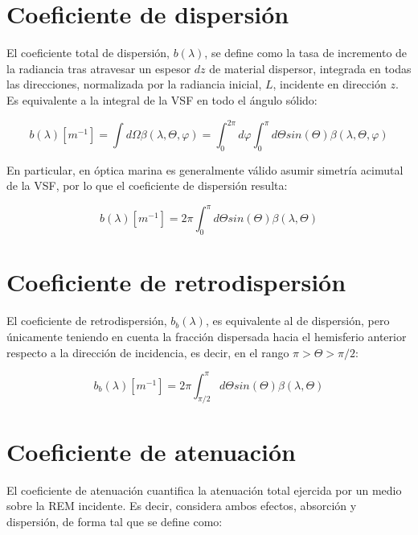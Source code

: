 \section{Coeficiente de dispersión}
\label{qssa:s:b}
    El coeficiente total de dispersión, $b(\lambda)$, se define como la tasa de incremento de la radiancia tras atravesar un espesor $dz$ de material dispersor, integrada en todas las direcciones, normalizada por la radiancia inicial, $L$, incidente en dirección $z$. Es equivalente a la integral de la VSF en todo el ángulo sólido:

    \begin{equation}
        b(\lambda)[m^{-1}] = 
        \int d\Omega \beta(\lambda,\Theta,\varphi) =
        \int_{0}^{2\pi} d\varphi \int_{0}^{\pi} d\Theta sin(\Theta) \beta(\lambda,\Theta,\varphi) 
        \label{qssa:eq:b}
    \end{equation}

    En particular, en óptica marina es generalmente válido asumir simetría acimutal de la VSF, por lo que el coeficiente de dispersión resulta:

    \begin{equation}
        b(\lambda)[m^{-1}] = 
        2\pi \int_{0}^{\pi} d\Theta sin(\Theta) \beta(\lambda,\Theta) 
        \label{qssa:eq:b_simAcim}
    \end{equation}

\section{Coeficiente de retrodispersión}
\label{qssa:s:bb}

    El coeficiente de retrodispersión, $b_{b}(\lambda)$, es equivalente al de dispersión, pero únicamente teniendo en cuenta la fracción dispersada hacia el hemisferio anterior respecto a la dirección de incidencia, es decir, en el rango $\pi>\Theta>\pi/2$:

    \begin{equation}
        b_{b}(\lambda)[m^{-1}] = 
        2\pi \int_{\pi/2}^{\pi} d\Theta sin(\Theta) \beta(\lambda,\Theta) 
        \label{qssa:eq:bb}
    \end{equation}

\section{Coeficiente de atenuación}
\label{qssa:s:c}

El coeficiente de atenuación cuantifica la atenuación total ejercida por un medio sobre la REM incidente. Es decir, considera ambos efectos, absorción y dispersión, de forma tal que se define como:

